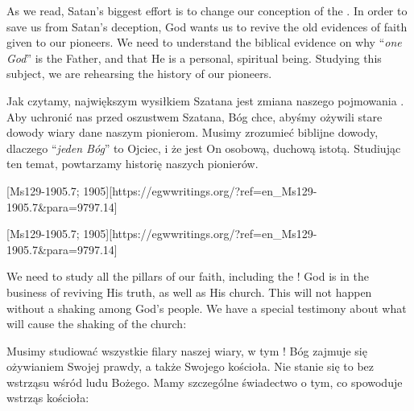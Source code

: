 As we read, Satan’s biggest effort is to change our conception of the . In order to save us from Satan’s deception, God wants us to revive the old evidences of faith given to our pioneers. We need to understand the biblical evidence on why “\textit{one God}” is the Father, and that He is a personal, spiritual being. Studying this subject, we are rehearsing the history of our pioneers.


Jak czytamy, największym wysiłkiem Szatana jest zmiana naszego pojmowania . Aby uchronić nas przed oszustwem Szatana, Bóg chce, abyśmy ożywili stare dowody wiary dane naszym pionierom. Musimy zrozumieć biblijne dowody, dlaczego “\textit{jeden Bóg}” to Ojciec, i że jest On osobową, duchową istotą. Studiując ten temat, powtarzamy historię naszych pionierów.


[Ms129-1905.7; 1905][https://egwwritings.org/?ref=en\_Ms129-1905.7&para=9797.14]


[Ms129-1905.7; 1905][https://egwwritings.org/?ref=en\_Ms129-1905.7&para=9797.14]


We need to study all the pillars of our faith, including the ! God is in the business of reviving His truth, as well as His church. This will not happen without a shaking among God’s people. We have a special testimony about what will cause the shaking of the church:


Musimy studiować wszystkie filary naszej wiary, w tym ! Bóg zajmuje się ożywianiem Swojej prawdy, a także Swojego kościoła. Nie stanie się to bez wstrząsu wśród ludu Bożego. Mamy szczególne świadectwo o tym, co spowoduje wstrząs kościoła:


